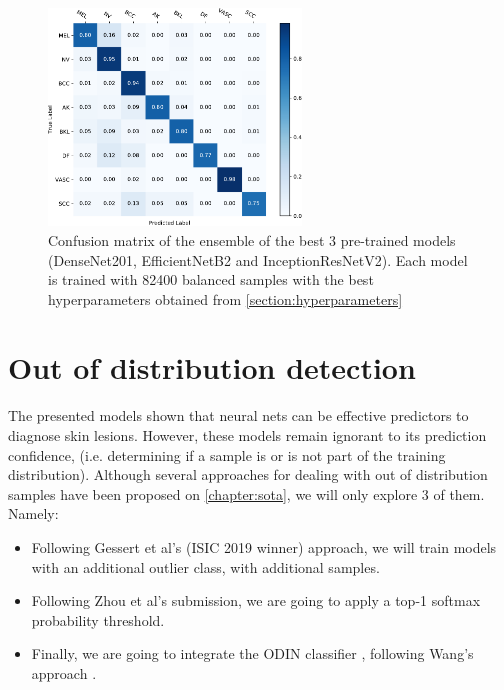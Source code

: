     \begin{figure}[ht]
        \centering
        \includegraphics[width=0.6\textwidth]{figs/densenet201_best_ensembe_3.pdf}
        \caption{Confusion matrix of the ensemble of the best 3 pre-trained models (DenseNet201, EfficientNetB2 and InceptionResNetV2). Each model is trained with 82400 balanced samples with the best hyperparameters obtained from \autoref{section:hyperparameters}}
        \label{fig:densenet201_best_ensembe_3}
    \end{figure}



\section{Out of distribution detection} \label{section:outdist}
    The presented models shown that neural nets can be effective predictors to diagnose skin lesions. However, these models remain ignorant to its prediction confidence, (i.e. determining if a sample is or is not part of the training distribution). Although several approaches for dealing with out of distribution samples have been proposed on \autoref{chapter:sota}, we will only explore 3 of them. Namely:
    
    \begin{itemize}
        \item Following Gessert et al's (ISIC 2019 winner) approach, we will train models with an additional outlier class, with additional samples.
        \item Following Zhou et al's submission, we are going to apply a top-1 softmax probability threshold.
        \item Finally, we are going to integrate the \ac{ODIN} classifier \cite{odin}, following Wang's approach \cite{Wang}.
    \end{itemize}
    
